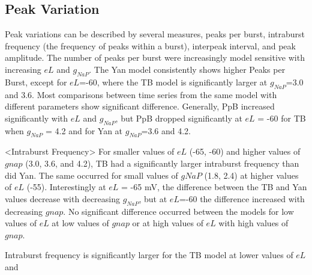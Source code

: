 \documentclass[11pt]{article}
\newcommand{\bcscale}{0.2}
\begin{document}
%
%


\subsection{Peak Variation}
Peak variations can be described by several measures, peaks per burst, intraburst frequency (the frequency of peaks within a burst), interpeak interval, and peak amplitude. The number of peaks per burst were increasingly model sensitive with increasing $eL$ and $g_{NaP}$. The Yan model consistently shows higher Peaks per Burst, except for $eL$=-60, where the TB model is significantly larger at $g_{NaP}$=3.0 and 3.6. Most comparisons between time series from the same model with different parameters show significant difference. Generally, PpB increased significantly with $eL$ and $g_{NaP}$, but PpB dropped significantly at $eL$ = -60 for TB  when $g_{NaP}$ = 4.2  and for Yan at $g_{NaP}$=3.6 and 4.2.


<Intraburst Frequency>
For smaller values of $eL$ (-65, -60) and higher values of $gnap$ (3.0, 3.6, and 4.2), TB had a significantly larger intraburst frequency than did Yan. The same occurred for small values of $gNaP$ (1.8, 2.4) at higher values of $eL$ (-55). Interestingly at $eL$ = -65 mV, the difference between the TB and Yan values decrease with decreasing $g_{NaP}$, but at $eL$=-60 the difference increased with decreasing $gnap$. No significant difference occurred between the models for low values of $eL$ at low values of $gnap$ or at high values of $eL$ with high values of $gnap$.

Intraburst frequency is significantly larger for the TB model at lower values of $eL$ and 
\end{document}
